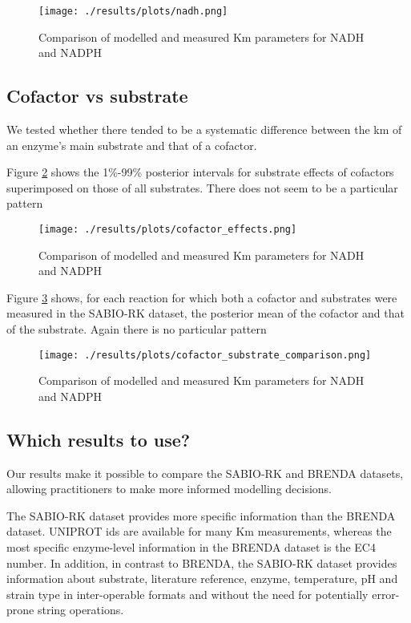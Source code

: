 \documentclass[11pt]{article}
\begin{document}
\begin{figure}[htbp]
\centering
\texttt{[image: ./results/plots/nadh.png]}
\caption{\label{fig:org60fc650}Comparison of modelled and measured Km parameters for NADH and NADPH}
\end{figure}

\subsection{Cofactor vs substrate}
\label{sec:orgbbe8b89}
We tested whether there tended to be a systematic difference between the km of
an enzyme's main substrate and that of a cofactor. 

Figure \ref{fig:org50108f5} shows the 1\%-99\% posterior intervals for substrate
effects of cofactors superimposed on those of all substrates. There does not
seem to be a particular pattern

\begin{figure}[htbp]
\centering
\texttt{[image: ./results/plots/cofactor\_effects.png]}
\caption{\label{fig:org50108f5}Comparison of modelled and measured Km parameters for NADH and NADPH}
\end{figure}

Figure \ref{fig:org41eb8bc} shows, for each reaction for which both a
cofactor and substrates were measured in the SABIO-RK dataset, the posterior
mean of the cofactor and that of the substrate. Again there is no particular
pattern

\begin{figure}[htbp]
\centering
\texttt{[image: ./results/plots/cofactor\_substrate\_comparison.png]}
\caption{\label{fig:org41eb8bc}Comparison of modelled and measured Km parameters for NADH and NADPH}
\end{figure}

\subsection{Which results to use?}
\label{sec:org6b5ba09}

Our results make it possible to compare the SABIO-RK and BRENDA datasets,
allowing practitioners to make more informed modelling decisions.

The SABIO-RK dataset provides more specific information than the BRENDA
dataset. UNIPROT ids are available for many Km measurements, whereas the most
specific enzyme-level information in the BRENDA dataset is the EC4 number. In
addition, in contrast to BRENDA, the SABIO-RK dataset provides information about
substrate, literature reference, enzyme, temperature, pH and strain type in
inter-operable formats and without the need for potentially error-prone string
operations.
\end{document}
